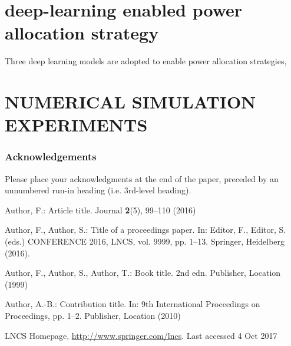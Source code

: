 \documentclass[runningheads]{llncs}
\begin{document}
\section{deep-learning enabled power allocation strategy}
Three deep learning models are adopted to enable power allocation strategies,  
\section{NUMERICAL SIMULATION EXPERIMENTS}

\subsubsection{Acknowledgements} Please place your acknowledgments at
the end of the paper, preceded by an unnumbered run-in heading (i.e.
3rd-level heading).

%
%
%
% 
% 
%
\begin{thebibliography}{8}
Author, F.: Article title. Journal \textbf{2}(5), 99--110 (2016)

Author, F., Author, S.: Title of a proceedings paper. In: Editor,
F., Editor, S. (eds.) CONFERENCE 2016, LNCS, vol. 9999, pp. 1--13.
Springer, Heidelberg (2016). 

Author, F., Author, S., Author, T.: Book title. 2nd edn. Publisher,
Location (1999)

Author, A.-B.: Contribution title. In: 9th International Proceedings
on Proceedings, pp. 1--2. Publisher, Location (2010)

LNCS Homepage, \url{http://www.springer.com/lncs}. Last accessed 4
Oct 2017
\end{thebibliography}
\end{document}
